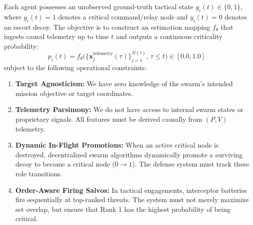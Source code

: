\documentclass[9pt]{ieeeconf}
\begin{document}
Each agent possesses an unobserved ground-truth tactical state $y_i(t) \in \{0, 1\}$, where $y_i(t) = 1$ denotes a critical command/relay node and $y_i(t) = 0$ denotes an escort decoy. The objective is to construct an estimation mapping $f_\theta$ that ingests causal telemetry up to time $t$ and outputs a continuous criticality probability:
\begin{equation}
p_i(t) = f_\theta \big( \{\mathbf{x}_j^{\text{telemetry}}(\tau)\}_{j=1}^{N(\tau)}, \, \tau \le t \big) \in [0.0, 1.0]
\end{equation}
subject to the following operational constraints:
\begin{enumerate}
    \item \textbf{Target Agnosticism:} We have zero knowledge of the swarm's intended mission objective or target coordinates.
    \item \textbf{Telemetry Parsimony:} We do not have access to internal swarm states or proprietary signals. All features must be derived causally from $(P, V)$ telemetry.
    \item \textbf{Dynamic In-Flight Promotions:} When an active critical node is destroyed, decentralized swarm algorithms dynamically promote a surviving decoy to become a critical node ($0 \to 1$). The defense system must track these role transitions.
    \item \textbf{Order-Aware Firing Salvos:} In tactical engagements, interceptor batteries fire sequentially at top-ranked threats. The system must not merely maximize set overlap, but ensure that Rank 1 has the highest probability of being critical.
\end{enumerate}
\end{document}

